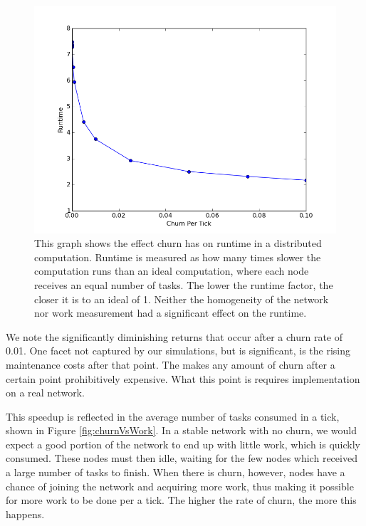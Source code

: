 \begin{figure}[h]
	\centering
	\includegraphics[width=0.7\linewidth]{figs/churnVsTime}
	\caption[Churn vs Runtime factor]{This graph shows the effect churn has on runtime in a distributed computation.
		Runtime is measured as how many times slower the computation runs than an ideal computation, where each node receives an equal number of tasks.
		The lower the runtime factor, the closer it is to an ideal of 1.
		Neither the homogeneity of the network nor work measurement had a significant effect on the runtime.}
	\label{fig:churnVsTime}
\end{figure}

We note the significantly diminishing returns that occur after a churn rate of 0.01.
One facet not captured by our simulations, but is significant, is the rising maintenance costs after that point.
The makes any amount of churn after a certain point prohibitively expensive.
What this point is requires implementation on a real network.

This speedup is reflected in the average number of tasks consumed in a tick, shown in Figure \ref{fig:churnVsWork}.
In a stable network with no churn, we would expect a good portion of the network to end up with little work, which is quickly consumed.
These nodes must then idle, waiting for the few nodes which received a large number of tasks to finish.
When there is churn, however, nodes have a chance of joining the network and acquiring more work, thus making it possible for more work to be done per a tick.
The higher the rate of churn, the more this happens.

